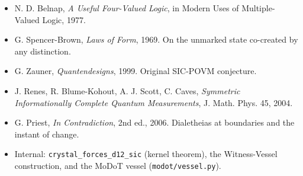 \begin{itemize}
\tightlist
\item
  N. D. Belnap, \emph{A Useful Four-Valued Logic}, in Modern Uses of
  Multiple-Valued Logic, 1977.
\item
  G. Spencer-Brown, \emph{Laws of Form}, 1969. On the unmarked state
  co-created by any distinction.
\item
  G. Zauner, \emph{Quantendesigns}, 1999. Original SIC-POVM conjecture.
\item
  J. Renes, R. Blume-Kohout, A. J. Scott, C. Caves, \emph{Symmetric
  Informationally Complete Quantum Measurements}, J. Math. Phys. 45,
  2004.
\item
  G. Priest, \emph{In Contradiction}, 2nd ed., 2006. Dialetheias at
  boundaries and the instant of change.
\item
  Internal: \texttt{crystal\_forces\_d12\_sic} (kernel theorem), the
  Witness-Vessel construction, and the MoDoT vessel
  (\texttt{modot/vessel.py}).
\end{itemize}
